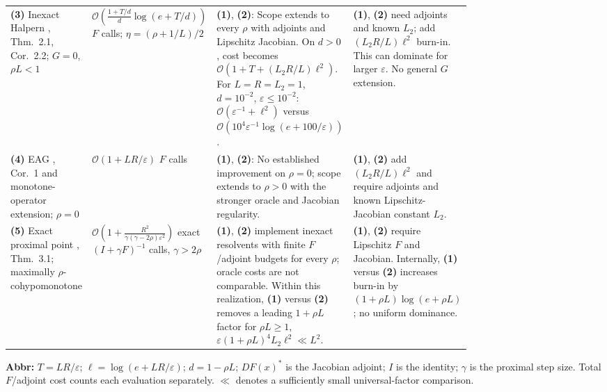 \begin{table}[tp]
\begin{threeparttable}
\begin{tabularx}{\linewidth}{@{}>{\raggedright\arraybackslash}p{0.20\linewidth}>{\raggedright\arraybackslash}p{0.32\linewidth}>{\raggedright\arraybackslash}p{0.25\linewidth}>{\raggedright\arraybackslash}X@{}}
& & \\
\midrule[1.2pt]
\textbf{(3)} Inexact Halpern \citep{cohypAKW2026v3}, Thm.~2.1, Cor.~2.2; $G=0$, $\rho L<1$
& $\mathcal{O}\!\left(\frac{1+T/d}{d}\log(e+T/d)\right)$ $F$ calls; $\eta=(\rho+1/L)/2$
& \textbf{(1)}, \textbf{(2)}: Scope extends to every $\rho$ with adjoints and Lipschitz Jacobian. On $d>0$, cost becomes $\mathcal{O}(1+T+(L_2R/L)\ell^2)$. For $L=R=L_2=1$, $d=10^{-2}$, $\varepsilon\le10^{-2}$: $\mathcal{O}(\varepsilon^{-1}+\ell^2)$ versus $\mathcal{O}(10^4\varepsilon^{-1}\log(e+100/\varepsilon))$.
& \textbf{(1)}, \textbf{(2)} need adjoints and known $L_2$; add $(L_2R/L)\ell^2$ burn-in. This can dominate for larger $\varepsilon$. No general $G$ extension. \\
\midrule
\textbf{(4)} EAG \citep{cohypYoonRyu2021}, Cor.~1 and monotone-operator extension; $\rho=0$
& $\mathcal{O}(1+LR/\varepsilon)$ $F$ calls
& \textbf{(1)}, \textbf{(2)}: No established improvement on $\rho=0$; scope extends to $\rho>0$ with the stronger oracle and Jacobian regularity.
& \textbf{(1)}, \textbf{(2)} add $(L_2R/L)\ell^2$ and require adjoints and known Lipschitz-Jacobian constant $L_2$. \\
\midrule
\textbf{(5)} Exact proximal point \citep{cohypGorbunov2023v3}, Thm.~3.1; maximally $\rho$-cohypomonotone
& $\mathcal{O}\!\left(1+\frac{R^2}{\gamma(\gamma-2\rho)\varepsilon^2}\right)$ exact $(I+\gamma F)^{-1}$ calls, $\gamma>2\rho$
& \textbf{(1)}, \textbf{(2)} implement inexact resolvents with finite $F$/adjoint budgets for every $\rho$; oracle costs are not comparable. Within this realization, \textbf{(1)} versus \textbf{(2)} removes a leading $1+\rho L$ factor for $\rho L\ge1$, $\varepsilon(1+\rho L)^4L_2\ell^2\ll L^2$.
& \textbf{(1)}, \textbf{(2)} require Lipschitz $F$ and Jacobian. Internally, \textbf{(1)} versus \textbf{(2)} increases burn-in by $(1+\rho L)\log(e+\rho L)$; no uniform dominance. \\
\bottomrule
\end{tabularx}
\begin{tablenotes}[flushleft]\footnotesize
\item[] \textbf{Abbr:} $T=LR/\varepsilon$; $\ell=\log(e+LR/\varepsilon)$; $d=1-\rho L$; $DF(x)^*$ is the Jacobian adjoint; $I$ is the identity; $\gamma$ is the proximal step size. Total $F$/adjoint cost counts each evaluation separately. $\ll$ denotes a sufficiently small universal-factor comparison.
\end{tablenotes}
\end{threeparttable}
\end{table}
\clearpage
